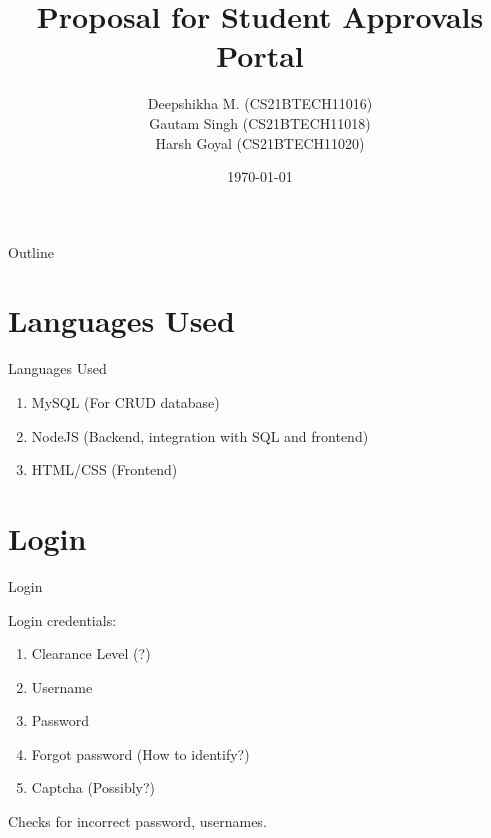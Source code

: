 \documentclass{beamer}
\title{Proposal for Student Approvals Portal}
\author[Deepshikha M. (CS21BTECH11016)]{Deepshikha M. (CS21BTECH11016) \\
Gautam Singh (CS21BTECH11018) \\
Harsh Goyal (CS21BTECH11020)}
\date{\today}
\begin{document}
\begin{frame}
    \titlepage 
\end{frame}

\begin{frame}{Outline}
    \tableofcontents
\end{frame}

\section{Languages Used}
\begin{frame}{Languages Used}
\begin{enumerate}
\item MySQL (For CRUD database)
\item NodeJS (Backend, integration with SQL and frontend)
\item HTML/CSS (Frontend)
\end{enumerate}
\end{frame}

\section{Login}
\begin{frame}{Login}

Login credentials:

\begin{enumerate}
\item Clearance Level (?)
\item Username
\item Password
\item Forgot password (How to identify?)
\item Captcha (Possibly?)
\end{enumerate}

Checks for incorrect password, usernames.
\end{frame}
\end{document}
